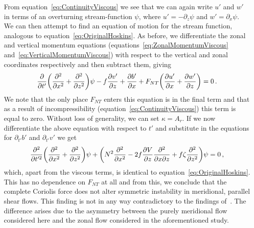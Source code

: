     From equation~\ref{eq:ContinuityViscous} we see that we can again write $u'$ and $w'$ in terms of an overturning stream-function $\psi$, where $u' = - \partial_z \psi$ and $w' = \partial_x \psi$. We can then attempt to find an equation of motion for the stream function, analogous to equation~\ref{eq:OriginalHoskins}. As before, we differentiate the zonal and vertical momentum equations (equations~\ref{eq:ZonalMomentumViscous} and~\ref{eq:VerticalMomentumViscous}) with respect to the vertical and zonal coordinates respectively and then subtract them, giving
    \begin{equation}
        \pdv{}{t'} \bigg( \pdv[2]{x} + \pdv[2]{z} \bigg) \psi - f \pdv{v'}{z} + \pdv{b'}{x} + F_{NT} \bigg( \pdv{u'}{x} + \pdv{w'}{z} \bigg) = 0 \, .
    \end{equation}
    We note that the only place $F_{NT}$ enters this equation is in the final term and that as a result of incompressibility (equation~\ref{eq:ContinuityViscous}) this term is equal to zero. Without loss of generality, we can set $\kappa = A_r$\footnotemark. If we now differentiate the above equation with respect to $t'$ and substitute in the equations for $\partial_{t'}b'$ and $\partial_{t'}v'$ we get
    \begin{equation}
        \frac{\partial^2}{\partial t'^2} \bigg(\pdv[2]{}{x} + \pdv[2]{}{z}\bigg) \psi + \bigg( N^2 \pdv[2]{}{x} - 2 f \pdv{V}{z} \pdv[2]{}{x}{z} + f \zeta \pdv[2]{}{z} \bigg) \psi = 0 \, ,
    \end{equation}
    which, apart from the viscous terms, is identical to equation~\ref{eq:OriginalHoskins}. This has no dependence on $F_{NT}$ at all and from this, we conclude that the complete Coriolis force does not alter symmetric instability in meridional, parallel shear flows. This finding is not in any way contradictory to the findings of~\citet{Zeitlin2018a}. The difference arises due to the asymmetry between the purely meridional flow considered here and the zonal flow considered in the aforementioned study.

